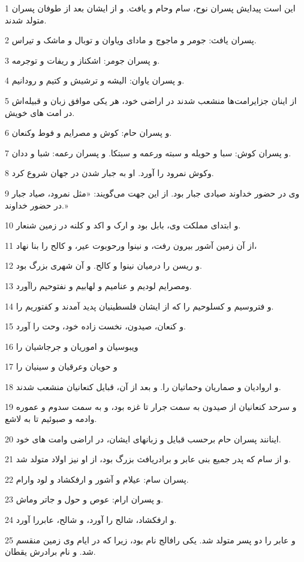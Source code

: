 \par 1 این است پیدایش پسران نوح، سام وحام و یافث. و از ایشان بعد از طوفان پسران متولد شدند.
\par 2 پسران یافث: جومر و ماجوج و مادای ویاوان و توبال و ماشک و تیراس.
\par 3 و پسران جومر: اشکناز و ریفات و توجرمه.
\par 4 و پسران یاوان: الیشه و ترشیش و کتیم و رودانیم.
\par 5 از اینان جزایرامت‌ها منشعب شدند در اراضی خود، هر یکی موافق زبان و قبیله‌اش در امت های خویش.
\par 6 و پسران حام: کوش و مصرایم و فوط وکنعان.
\par 7 و پسران کوش: سبا و حویله و سبته ورعمه و سبتکا. و پسران رعمه: شبا و ددان.
\par 8 وکوش نمرود را آورد. او به جبار شدن در جهان شروع کرد.
\par 9 وی در حضور خداوند صیادی جبار بود. از این جهت می‌گویند: «مثل نمرود، صیاد جبار در حضور خداوند.»
\par 10 و ابتدای مملکت وی، بابل بود و ارک و اکد و کلنه در زمین شنعار.
\par 11 از آن زمین آشور بیرون رفت، و نینوا ورحوبوت عیر، و کالح را بنا نهاد،
\par 12 و ریسن را درمیان نینوا و کالح. و آن شهری بزرگ بود.
\par 13 ومصرایم لودیم و عنامیم و لهابیم و نفتوحیم راآورد.
\par 14 و فتروسیم و کسلوحیم را که از ایشان فلسطینیان پدید آمدند و کفتوریم را.
\par 15 و کنعان، صیدون، نخست زاده خود، وحت را آورد.
\par 16 ویبوسیان و اموریان و جرجاشیان را
\par 17 و حویان وعرقیان و سینیان را
\par 18 و اروادیان و صماریان وحماتیان را. و بعد از آن، قبایل کنعانیان منشعب شدند.
\par 19 و سرحد کنعانیان از صیدون به سمت جرار تا غزه بود، و به سمت سدوم و عموره وادمه و صبوئیم تا به لاشع.
\par 20 اینانند پسران حام برحسب قبایل و زبانهای ایشان، در اراضی وامت های خود.
\par 21 و از سام که پدر جمیع بنی عابر و برادریافث بزرگ بود، از او نیز اولاد متولد شد.
\par 22 پسران سام: عیلام و آشور و ارفکشاد و لود وارام.
\par 23 و پسران ارام: عوص و حول و جاتر وماش.
\par 24 و ارفکشاد، شالح را آورد، و شالح، عابررا آورد.
\par 25 و عابر را دو پسر متولد شد. یکی رافالج نام بود، زیرا که در ایام وی زمین منقسم شد. و نام برادرش یقطان.
